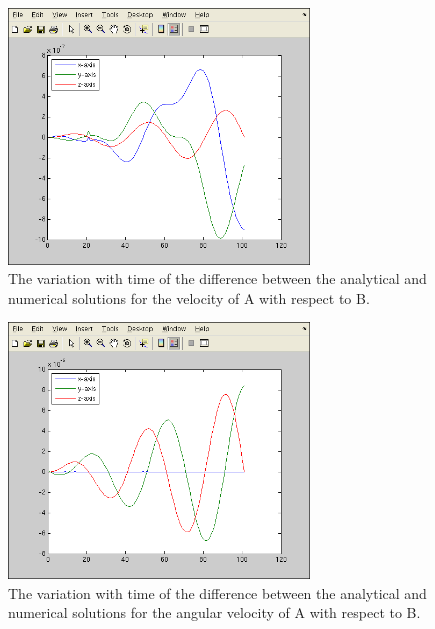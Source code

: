 \begin{description}
 \begin{figure}[!ht]
  \begin{center}
        \includegraphics[width=80mm]{figures/relative7_vab.png}
        \caption{The variation with time of the difference between the analytical and numerical solutions for the velocity of A with respect to B.} 
  \end{center}
\end{figure}

 \begin{figure}[!ht]
  \begin{center}
        \includegraphics[width=80mm]{figures/relative7_wab.png}
        \caption{The variation with time of the difference between the analytical and numerical solutions for the angular velocity of A with respect to B.} 
  \end{center}
\end{figure}


\end{description}

